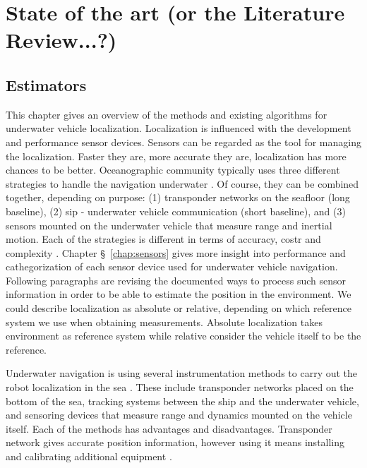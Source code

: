 \chapter{State of the art (or the Literature Review...?)} \label{chap:state-of-the-art}

\section{Estimators}

This chapter gives an overview of the methods and existing algorithms for underwater vehicle localization. Localization is influenced with the development and performance sensor devices. Sensors can be regarded as the tool for managing the localization. Faster they are, more accurate they are, localization has more chances to be better. Oceanographic community typically uses three different strategies to handle the navigation underwater \cite{whitcomb99}. Of course, they can be combined together, depending on purpose: (1) transponder networks on the seafloor (long baseline), (2) sip - underwater vehicle communication (short baseline), and (3) sensors mounted on the underwater vehicle that measure range and inertial motion. Each of the strategies is different in terms of accuracy, costr and complexity \cite{eustice05}. Chapter \S~\ref{chap:sensors} gives more insight into performance and cathegorization of each sensor device used for underwater vehicle navigation. Following paragraphs are revising the documented ways to process such sensor information in order to be able to estimate the position in the environment. We could describe localization as absolute or relative, depending on which reference system we use when obtaining measurements. Absolute localization takes environment as reference system while relative consider the vehicle itself to be the reference. 

Underwater navigation is using several instrumentation methods to carry out the robot localization in the sea \cite{whitcomb99}. These include transponder networks placed on the bottom of the sea, tracking systems between the ship and the underwater vehicle, and sensoring devices that measure range and dynamics mounted on the vehicle itself. Each of the methods has advantages and disadvantages. Transponder network gives accurate position information, however using it means installing and calibrating additional equipment \cite{eustice05}. 

